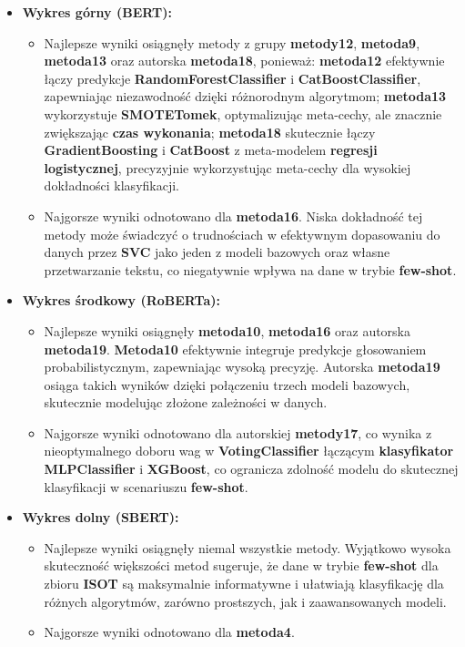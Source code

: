 \begin{itemize}
	\item \textbf{Wykres górny (BERT):}
	      \begin{itemize}
		      \item Najlepsze wyniki osiągnęły metody z grupy \textbf{metody12}, \textbf{metoda9}, \textbf{metoda13} oraz autorska \textbf{metoda18}, ponieważ: \textbf{metoda12} efektywnie łączy predykcje \textbf{RandomForestClassifier} i \textbf{CatBoostClassifier}, zapewniając niezawodność dzięki różnorodnym algorytmom; \textbf{metoda13} wykorzystuje \textbf{SMOTETomek}, optymalizując meta-cechy, ale znacznie zwiększając \textbf{czas wykonania}; \textbf{metoda18} skutecznie łączy \textbf{GradientBoosting} i \textbf{CatBoost} z meta-modelem \textbf{regresji logistycznej}, precyzyjnie wykorzystując meta-cechy dla wysokiej dokładności klasyfikacji.
		      \item Najgorsze wyniki odnotowano dla \textbf{metoda16}. Niska dokładność tej metody może świadczyć o trudnościach w efektywnym dopasowaniu do danych przez \textbf{SVC} jako jeden z modeli bazowych oraz własne przetwarzanie tekstu, co niegatywnie wpływa na dane w trybie \textbf{few-shot}.
	      \end{itemize}

	\item \textbf{Wykres środkowy (RoBERTa):}
	      \begin{itemize}
		      \item Najlepsze wyniki osiągnęły \textbf{metoda10}, \textbf{metoda16} oraz autorska \textbf{metoda19}. \textbf{Metoda10} efektywnie integruje predykcje głosowaniem probabilistycznym, zapewniając wysoką precyzję. Autorska \textbf{metoda19} osiąga takich wyników dzięki połączeniu trzech modeli bazowych, skutecznie modelując złożone zależności w danych.
		      \item Najgorsze wyniki odnotowano dla autorskiej \textbf{metody17}, co wynika z nieoptymalnego doboru wag w \textbf{VotingClassifier} łączącym \textbf{klasyfikator MLPClassifier} i \textbf{XGBoost}, co ogranicza zdolność modelu do skutecznej klasyfikacji w scenariuszu \textbf{few-shot}.
	      \end{itemize}

	\item \textbf{Wykres dolny (SBERT):}
	      \begin{itemize}
		      \item Najlepsze wyniki osiągnęły niemal wszystkie metody. Wyjątkowo wysoka skuteczność większości metod sugeruje, że dane w trybie \textbf{few-shot} dla zbioru \textbf{ISOT} są maksymalnie informatywne i ułatwiają klasyfikację dla różnych algorytmów, zarówno prostszych, jak i zaawansowanych modeli.
		      \item Najgorsze wyniki odnotowano dla \textbf{metoda4}.
	      \end{itemize}
\end{itemize}

